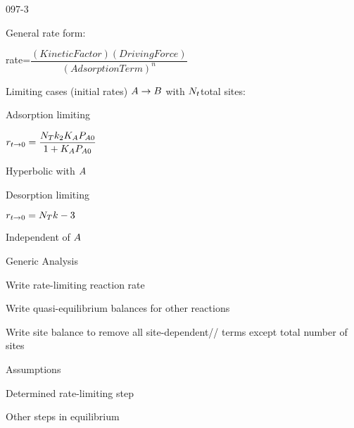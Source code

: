 \begin{mitframe}{097-3}
\begin{listone}
	\item General rate form:
		\begin{listtwo}
        	\item rate=$\dfrac{(Kinetic Factor)(Driving Force)}{(Adsorption Term)^n}$
        \end{listtwo}
	\item Limiting cases (initial rates) $\helmholtz\rightarrow\exergy$ with $\nummoles_{\timet} $total sites:
    	\begin{listtwo}
        	\item Adsorption limiting
            	\begin{listthree}
                	\item $\pos_{\timet\rightarrow\init}=\dfrac{\nummoles_{\Temp}\thermcond_2\dilfac_{\helmholtz}\p_{\helmholtz\init}}{1+\dilfac_{\helmholtz}\p_{\helmholtz\init}}$
                    \item Hyperbolic with $\helmholtz$
                \end{listthree}
        	\item Desorption limiting
            	\begin{listthree}
                	\item $\pos_{\timet\rightarrow\init}=\nummoles_{\Temp}\thermcond-3$
                    \item Independent of $\helmholtz$
                \end{listthree}
        \end{listtwo}
	\item Generic Analysis
    	\begin{listtwo}
    		\item Write rate-limiting reaction rate
            \item Write quasi-equilibrium balances for other reactions
            \item Write site balance to remove all site-dependent//
            terms except total number of sites
          \end{listtwo}
\item Assumptions
		\begin{listtwo}
        		\item Determined rate-limiting step
                \item Other steps in equilibrium
        \end{listtwo}
\end{listone}     
\end{mitframe}